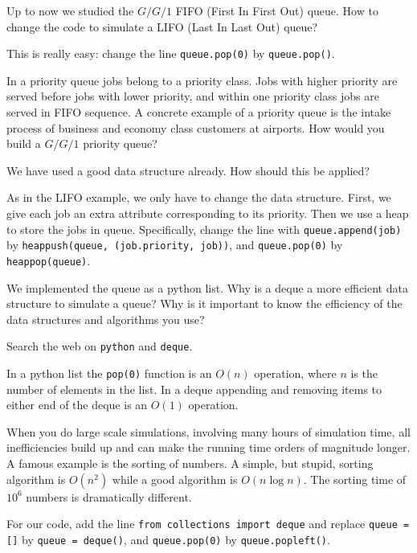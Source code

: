 \documentclass{scrartcl}
\begin{document}
\begin{exercise}
  Up to now we studied the $G/G/1$ FIFO (First In First Out) queue. How to change the code to simulate a LIFO (Last In Last Out) queue?
  \begin{solution}
    This is really easy: change the line \texttt{queue.pop(0)} by  \texttt{queue.pop()}. 
 \end{solution}
\end{exercise}

\begin{exercise}
  In a priority queue  jobs belong to a priority class. Jobs with higher priority are served before jobs with lower priority, and within one priority class jobs are served in FIFO sequence. A concrete example of a priority queue is the intake process of business and economy class customers at airports.  How would you build a $G/G/1$ priority queue?
  \hintsymbol\begin{hint}
We have used a good data structure already. How should this be applied?
  \end{hint}
\begin{solution}
  As in the LIFO example, we only have to change the data structure. First, we give each job an extra attribute corresponding to its priority. Then we use a heap to store the jobs in queue. Specifically,  change the line with
\texttt{queue.append(job)} by \texttt{heappush(queue, (job.priority, job))}, and \texttt{queue.pop(0)} by \texttt{heappop(queue)}. 

\end{solution}
\end{exercise}

\begin{exercise}

  We implemented the queue as a python list. Why is a deque a more efficient data structure to simulate a queue?  Why is it important to know the efficiency of the data structures and algorithms you use?
  \hintsymbol\begin{hint}
  Search the web on \texttt{python} and \texttt{deque}.
  \end{hint}
  \begin{solution}
    In a python list the \texttt{pop(0)} function is an $O(n)$ operation, where $n$ is the number of elements in the list. In a deque appending and removing items to either end of the deque is an $O(1)$ operation.

When you do large scale simulations, involving many hours of simulation time, all inefficiencies build up and can make the running time orders of magnitude longer. A famous example is the sorting of numbers. A simple, but stupid, sorting algorithm is $O(n^2)$ while a good algorithm is $O(n \log n)$. The sorting time of $10^6$ numbers is dramatically different. 

    For our code, add the line \texttt{from collections import deque} and replace \texttt{queue = []} by \texttt{queue = deque()}, and \texttt{queue.pop(0)}  by \texttt{queue.popleft()}.
  \end{solution}
\end{exercise}
\end{document}
